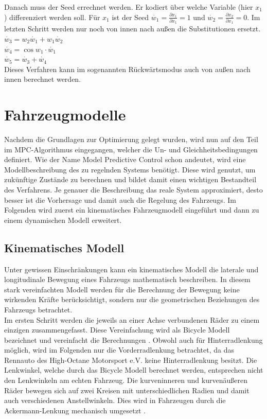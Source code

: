 \documentclass{like}
\begin{document}
Danach muss der Seed errechnet werden. Er kodiert über welche Variable (hier $x_1$) differenziert werden soll. Für $x_1$ ist der Seed $\dot{w_1} = \frac{\partial x_1}{\partial x_1} = 1$ und   $\dot{w_2} = \frac{\partial x_2}{\partial x_1} = 0$.
Im letzten Schritt werden nur noch von innen nach außen die Substitutionen ersetzt. \\
$\dot{w_3} = w_2\dot{w_1} + w_1 \dot{w_2}$ \\
$\dot{w_4} = \cos{w_1} \cdot \dot{w_1}$ \\
$\dot{w_5} = \dot{w_3} + \dot{w_4}$ \\
Dieses Verfahren kann im sogenannten Rückwärtsmodus auch von außen nach innen berechnet werden.  

\newpage
\section{Fahrzeugmodelle}
Nachdem die Grundlagen zur Optimierung gelegt wurden, wird nun auf den Teil im \ac{MPC}-Algorithmus eingegangen, welcher die Un- und Gleichheitsbedingungen definiert.
Wie der Name Model Predictive Control schon andeutet, wird eine Modellbeschreibung des zu regelnden Systems benötigt. Diese wird genutzt, um zukünftige Zustände zu berechnen und bildet damit einen wichtigen Bestandteil des Verfahrens. Je genauer die Beschreibung das reale System approximiert, desto besser ist die Vorhersage und damit auch die Regelung des Fahrzeugs.
Im Folgenden wird zuerst ein kinematisches Fahrzeugmodell eingeführt und dann zu einem dynamischen Modell erweitert.   

\subsection{Kinematisches Modell}
\label{kinematicModel}
Unter gewissen Einschränkungen kann ein kinematisches Modell die laterale und lon\-gi\-tu\-di\-nale Bewegung eines Fahrzeugs mathematisch beschreiben. In diesem stark vereinfachten Modell werden für die Berechnung der Bewegung keine wirkenden Kräfte berücksichtigt, sondern nur die geometrischen Beziehungen des Fahrzeugs betrachtet. \\
Im ersten Schritt werden die jeweils an einer Achse verbundenen Räder zu einem einzigen zusammengefasst. Diese Vereinfachung wird als Bicycle Modell bezeichnet und vereinfacht die Berechnungen \cite{BicycleModel}. Obwohl auch für Hinterradlenkung möglich, wird im Fol\-gen\-den nur die Vorderradlenkung betrachtet, da das Rennauto des High-Octane Motorsport e.V. keine Hinterradlenkung besitzt. Die Lenkwinkel, welche durch das Bicycle Modell berechnet werden, entsprechen nicht den Lenkwinkeln am echten Fahrzeug. Die kurven\-inneren und kurvenäußeren Räder bewegen sich auf zwei Kreisen mit unterschiedlichen Radien und damit auch verschiedenen Anstellwinkeln. Dies wird in Fahrzeugen durch die Ackermann-Lenkung mechanisch umgesetzt \cite{rajamani2011vehicle}.
\end{document}
